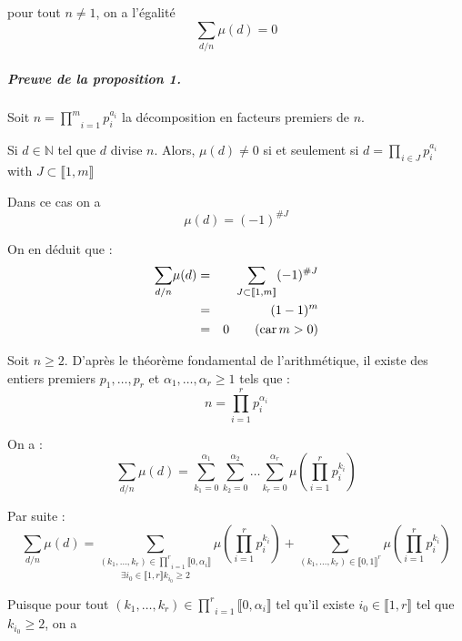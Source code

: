 pour tout $n \neq 1$, on a l'{\'e}galit{\'e}
\[ \underset{d / n}{\sum} \mu (d) = 0 \]

\subparagraph{Preuve de la proposition 1.}


Soit $n = \underset{i = 1}{\overset{m}{\prod}} p^{a_i}_i$ la d{\'e}composition
en facteurs premiers de $n$.



Si $d \in \mathbb{N}$ tel que $d$ divise $n$. Alors, $\mu (d) \neq 0$ si et
seulement si $d = \underset{i \in J}{\overset{}{\prod}} p^{a_i}_i$ with $J
\subset \llbracket 1, m \rrbracket$

Dans ce cas on a
\[ \mu (d) = (- 1)^{\#J} \]


On en d{\'e}duit que :
\begin{eqnarray*}
  \underset{d / n}{\sum} \mu (d) & = & \underset{J \subset \llbracket 1, m
  \rrbracket}{\sum} (- 1)^{\#J}\\
  & = & (1 - 1)^m\\
  & = & 0 \qquad (\operatorname{car} m > 0)
\end{eqnarray*}



Soit $n \geqslant 2$. D'apr{\`e}s le th{\'e}or{\`e}me fondamental de
l'arithm{\'e}tique, il existe des entiers premiers $p_1, \ldots, p_r$ et
$\alpha_1, \ldots, \alpha_r \geqslant 1$ tels que :
\[ n = \underset{i = 1}{\overset{r}{\prod}} p^{\alpha_i}_i \]


On a :
\[ \underset{d / n}{\sum} \mu (d) = \underset{k_1 =
   0}{\overset{\alpha_1}{\sum}} \underset{k_2 = 0}{\overset{\alpha_2}{\sum}}
   \ldots \underset{k_r = 0}{\overset{\alpha_r}{\sum}} \mu \left( \underset{i
   = 1}{\overset{r}{\prod}} p^{k_i}_i \right) \]


Par suite :
\[ \underset{d / n}{\sum} \mu (d) = \underset{\exists i_0 \in \llbracket 1, r
   \rrbracket k_{i_0} \geqslant 2}{\underset{(k_1, \ldots, k_r) \in
   \underset{i = 1}{\overset{r}{\prod}} \llbracket 0, \alpha_i
   \rrbracket}{\overset{}{\sum}}} \mu \left( \underset{i =
   1}{\overset{r}{\prod}} p^{k_i}_i \right) + \underset{}{\underset{(k_1,
   \ldots, k_r) \in \llbracket 0, 1 \rrbracket^r}{\overset{}{\sum}}} \mu
   \left( \underset{i = 1}{\overset{r}{\prod}} p^{k_i}_i \right) \]


Puisque pour tout $(k_1, \ldots, k_r) \in \underset{i = 1}{\overset{r}{\prod}}
\llbracket 0, \alpha_i \rrbracket$ tel qu'il existe $i_0 \in \llbracket 1, r
\rrbracket$ tel que $k_{i_0} \geqslant 2$, on a


